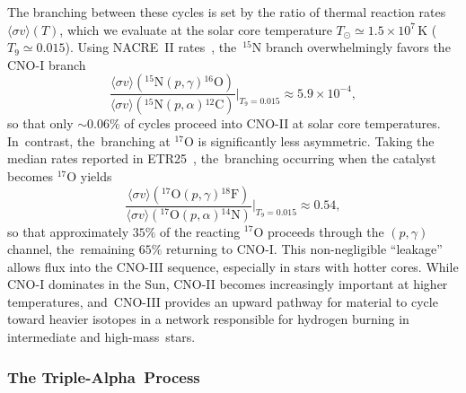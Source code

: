 \documentclass[particles,article,accept,pdftex,moreauthors]{Definitions/mdpi}
\newcommand*{\xblue}{}
\begin{document}
The branching between these cycles is set by the ratio of thermal reaction rates $\langle\sigma v\rangle(T)$, which we evaluate at the solar core temperature $T_{\odot}\simeq1.5\times10^{7}\,\mathrm{K}$ ($T_{9}\simeq 0.015$). Using NACRE~II rates~\cite{Xu:2013fha}, the~${}^{15}$N branch overwhelmingly favors the CNO-I branch
\begin{equation}
\frac{\langle\sigma v\rangle({}^{15}\mathrm{N}(p,\gamma){}^{16}\mathrm{O})}
 {\langle\sigma v\rangle({}^{15}\mathrm{N}(p,\alpha){}^{12}\mathrm{C})}
 \Bigg|_{T_{9}=0.015}
 \approx 5.9\times10^{-4},
\end{equation}
so that only ${\sim}0.06\%$ of cycles proceed into CNO-II at solar core temperatures. In~contrast, the~branching at ${}^{17}$O is significantly less asymmetric. {\xblue Taking the median rates reported in ETR25~\cite{Iliadis:2026hww,iliadis_2025_17610211}, the~branching occurring when the catalyst becomes ${}^{17}\mathrm{O}$ yields
\begin{equation}
\frac{\langle\sigma v\rangle({}^{17}\mathrm{O}(p,\gamma){}^{18}\mathrm{F})}
 {\langle\sigma v\rangle({}^{17}\mathrm{O}(p,\alpha){}^{14}\mathrm{N})}
 \Bigg|_{T_{9}=0.015}
 \approx 0.54,
\end{equation}
so that approximately $35\%$ of the reacting ${}^{17}$O proceeds through the $(p,\gamma)$ channel, the~remaining $65\%$ returning to CNO-I.} This non-negligible ``leakage'' allows flux into the CNO-III sequence, especially in stars with hotter cores. While CNO-I dominates in the Sun, CNO-II becomes increasingly important at higher temperatures, and~CNO-III provides an upward pathway for material to cycle toward heavier isotopes in a network responsible for hydrogen burning in intermediate and high-mass~stars.


\subsubsection{The Triple-Alpha~Process}\label{sec:TripleAlpha}
\end{document}
